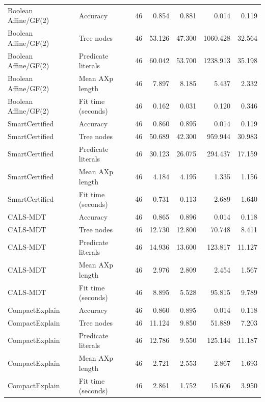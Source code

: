 \begin{longtable}{llrrrrr}
Boolean Affine/GF(2) & Accuracy & 46 & 0.854 & 0.881 & 0.014 & 0.119 \\
Boolean Affine/GF(2) & Tree nodes & 46 & 53.126 & 47.300 & 1060.428 & 32.564 \\
Boolean Affine/GF(2) & Predicate literals & 46 & 60.042 & 53.700 & 1238.913 & 35.198 \\
Boolean Affine/GF(2) & Mean AXp length & 46 & 7.897 & 8.185 & 5.437 & 2.332 \\
Boolean Affine/GF(2) & Fit time (seconds) & 46 & 0.162 & 0.031 & 0.120 & 0.346 \\
SmartCertified & Accuracy & 46 & 0.860 & 0.895 & 0.014 & 0.119 \\
SmartCertified & Tree nodes & 46 & 50.689 & 42.300 & 959.944 & 30.983 \\
SmartCertified & Predicate literals & 46 & 30.123 & 26.075 & 294.437 & 17.159 \\
SmartCertified & Mean AXp length & 46 & 4.184 & 4.195 & 1.335 & 1.156 \\
SmartCertified & Fit time (seconds) & 46 & 0.731 & 0.113 & 2.689 & 1.640 \\
CALS-MDT & Accuracy & 46 & 0.865 & 0.896 & 0.014 & 0.118 \\
CALS-MDT & Tree nodes & 46 & 12.730 & 12.800 & 70.748 & 8.411 \\
CALS-MDT & Predicate literals & 46 & 14.936 & 13.600 & 123.817 & 11.127 \\
CALS-MDT & Mean AXp length & 46 & 2.976 & 2.809 & 2.454 & 1.567 \\
CALS-MDT & Fit time (seconds) & 46 & 8.895 & 5.528 & 95.815 & 9.789 \\
CompactExplain & Accuracy & 46 & 0.860 & 0.895 & 0.014 & 0.118 \\
CompactExplain & Tree nodes & 46 & 11.124 & 9.850 & 51.889 & 7.203 \\
CompactExplain & Predicate literals & 46 & 12.786 & 9.550 & 125.144 & 11.187 \\
CompactExplain & Mean AXp length & 46 & 2.721 & 2.553 & 2.867 & 1.693 \\
CompactExplain & Fit time (seconds) & 46 & 2.861 & 1.752 & 15.606 & 3.950 \\
\bottomrule
\end{longtable}
\endgroup

